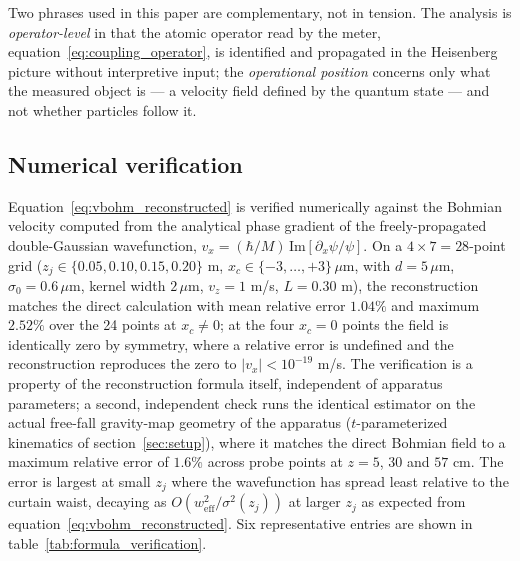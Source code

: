 \documentclass[11pt,a4paper]{article}
\begin{document}
Two phrases used in this paper are complementary, not in tension. The analysis is \emph{operator-level} in that the atomic operator read by the meter, equation~\eqref{eq:coupling_operator}, is identified and propagated in the Heisenberg picture without interpretive input; the \emph{operational position} concerns only what the measured object is --- a velocity field defined by the quantum state --- and not whether particles follow it.

\subsection{Numerical verification}
\label{sec:num_verif}

Equation~\eqref{eq:vbohm_reconstructed} is verified numerically against the Bohmian velocity computed from the analytical phase gradient of the freely-propagated double-Gaussian wavefunction, $v_x = (\hbar/M)\,\mathrm{Im}[\partial_x\psi/\psi]$. On a $4 \times 7 = 28$-point grid ($z_j \in \{0.05, 0.10, 0.15, 0.20\}$ m, $x_c \in \{-3, \ldots, +3\}\,\mu$m, with $d = 5\,\mu$m, $\sigma_0 = 0.6\,\mu$m, kernel width $2\,\mu$m, $v_z = 1$ m/s, $L = 0.30$ m), the reconstruction matches the direct calculation with mean relative error $1.04\%$ and maximum $2.52\%$ over the 24 points at $x_c \neq 0$; at the four $x_c = 0$ points the field is identically zero by symmetry, where a relative error is undefined and the reconstruction reproduces the zero to $|v_x| < 10^{-19}$ m/s. The verification is a property of the reconstruction formula itself, independent of apparatus parameters; a second, independent check runs the identical estimator on the actual free-fall gravity-map geometry of the apparatus ($t$-parameterized kinematics of section~\ref{sec:setup}), where it matches the direct Bohmian field to a maximum relative error of $1.6\%$ across probe points at $z = 5$, $30$ and $57$ cm. The error is largest at small $z_j$ where the wavefunction has spread least relative to the curtain waist, decaying as $O(w_\text{eff}^2/\sigma^2(z_j))$ at larger $z_j$ as expected from equation~\eqref{eq:vbohm_reconstructed}. Six representative entries are shown in table~\ref{tab:formula_verification}.
\end{document}
